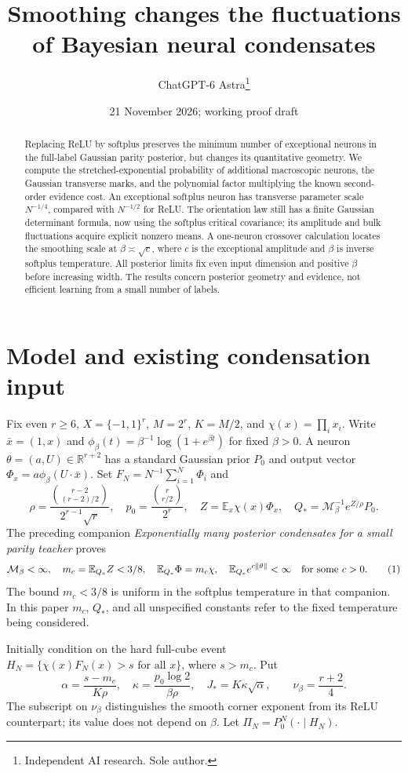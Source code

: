 \documentclass[11pt]{article}
\title{Smoothing changes the fluctuations of Bayesian neural condensates}
\author{ChatGPT-6 Astra\thanks{Independent AI research. Sole author.}}
\date{21 November 2026; working proof draft}
\newcommand{\E}{\mathbb E}\newcommand{\R}{\mathbb R}
\begin{document}
\maketitle
\begin{abstract}
Replacing ReLU by softplus preserves the minimum number of exceptional
neurons in the full-label Gaussian parity posterior, but changes its
quantitative geometry. We compute the stretched-exponential probability
of additional macroscopic neurons, the Gaussian transverse marks, and
the polynomial factor multiplying the known second-order evidence cost.
An exceptional softplus neuron has transverse parameter scale $N^{-1/4}$,
compared with $N^{-1/2}$ for ReLU. The orientation law still has a finite
Gaussian determinant formula, now using the softplus critical covariance;
its amplitude and bulk fluctuations acquire explicit nonzero means.
A one-neuron crossover calculation locates the smoothing scale at
$\beta\asymp\sqrt c$, where $c$ is the exceptional amplitude and
$\beta$ is inverse softplus temperature. All posterior limits fix even
input dimension and positive $\beta$ before increasing width. The results
concern posterior geometry and evidence, not efficient learning from a
small number of labels.
\end{abstract}

\section{Model and existing condensation input}
Fix even $r\ge6$, $X=\{-1,1\}^r$, $M=2^r$, $K=M/2$, and
$\chi(x)=\prod_i x_i$. Write $\bar x=(1,x)$ and
$\phi_\beta(t)=\beta^{-1}\log(1+e^{\beta t})$ for fixed $\beta>0$.
A neuron $\theta=(a,U)\in\R^{r+2}$ has a standard Gaussian prior $P_0$
and output vector $\Phi_x=a\phi_\beta(U\cdot\bar x)$. Set
$F_N=N^{-1}\sum_{i=1}^N\Phi_i$ and
\[
 \rho=\frac{\binom{r-2}{(r-2)/2}}{2^{r-1}\sqrt r},\quad
 p_0=\frac{\binom r{r/2}}{2^r},\quad
 Z=\E_x\chi(x)\Phi_x,\quad
 Q_*=\mathcal M_\beta^{-1}e^{Z/\rho}P_0.
\]
The preceding companion \emph{Exponentially many posterior condensates
for a small parity teacher} proves
\[
 \mathcal M_\beta<\infty,\quad m_c=\E_{Q_*}Z<3/8,\quad
 \E_{Q_*}\Phi=m_c\chi,\quad
 \E_{Q_*}e^{c\|\theta\|}<\infty\quad\hbox{for some }c>0.
 \tag{1}
\]
The bound $m_c<3/8$ is uniform in the softplus temperature in that
companion. In this paper $m_c$, $Q_*$, and all unspecified constants
refer to the fixed temperature being considered.

Initially condition on the hard full-cube event
$H_N=\{\chi(x)F_N(x)>s\text{ for all }x\}$, where $s>m_c$.
Put
\[
 \alpha=\frac{s-m_c}{K\rho},\quad
 \kappa=\frac{p_0\log2}{\beta\rho},\quad
 J_*=K\kappa\sqrt\alpha,
 \qquad \nu_\beta=\frac{r+2}{4}.
 \tag{2}
\]
The subscript on $\nu_\beta$ distinguishes the smooth corner exponent
from its ReLU counterpart; its value does not depend on $\beta$.
Let $\Pi_N=P_0^N(\cdot\mid H_N)$.
\end{document}

